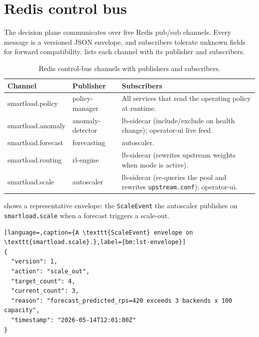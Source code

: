 \section{Redis control bus}
\label{bm:sec-bus}

The decision plane communicates over five Redis \cite{carlson2013redis} pub/sub
channels. Every message is a versioned JSON envelope, and subscribers tolerate
unknown fields for forward compatibility.  lists each
channel with its publisher and subscribers.

\begin{table}[htbp]
  \centering
  \caption[Redis control-bus channels]{Redis control-bus channels with publishers and subscribers.}
  \label{bm:tab-channels}
  \small
  \begin{tabularx}{\linewidth}{@{}l l Y@{}}
    \toprule
    \textbf{Channel} & \textbf{Publisher} & \textbf{Subscribers} \\
    \midrule
    smartload.policy   & policy-manager   & All services that read the operating policy at runtime. \\
    smartload.anomaly  & anomaly-detector & lb-sidecar (include/exclude on health change); operator-ui live feed. \\
    smartload.forecast & forecasting      & autoscaler. \\
    smartload.routing  & rl-engine        & lb-sidecar (rewrites upstream weights when mode is active). \\
    smartload.scale    & autoscaler       & lb-sidecar (re-queries the pool and rewrites \texttt{upstream.conf}); operator-ui. \\
    \bottomrule
  \end{tabularx}
\end{table}

 shows a representative envelope: the \texttt{ScaleEvent}
the autoscaler publishes on \texttt{smartload.scale} when a forecast triggers a
scale-out.

\begin{lstlisting}[language=,caption={A \texttt{ScaleEvent} envelope on \texttt{smartload.scale}.},label={bm:lst-envelope}]
{
  "version": 1,
  "action": "scale_out",
  "target_count": 4,
  "current_count": 3,
  "reason": "forecast_predicted_rps=420 exceeds 3 backends x 100 capacity",
  "timestamp": "2026-05-14T12:01:00Z"
}
\end{lstlisting}

